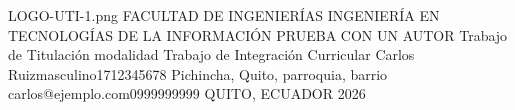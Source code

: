 \documentclass[12pt,a4paper,oneside]{report}
\begin{document}
\UTIPortada
{LOGO-UTI-1.png}
{FACULTAD DE INGENIERÍAS}
{INGENIERÍA EN TECNOLOGÍAS DE LA INFORMACIÓN}
{PRUEBA CON UN AUTOR}
{Trabajo de Titulación modalidad Trabajo de Integración Curricular}
{\UTIDatosAutores
  {Carlos Ruiz}{masculino}{1712345678}
  {Pichincha, Quito, parroquia, barrio}
  {carlos@ejemplo.com}{0999999999}}
{}
{QUITO, ECUADOR}
{2026}
\UTIFrontMatter



\end{document}
